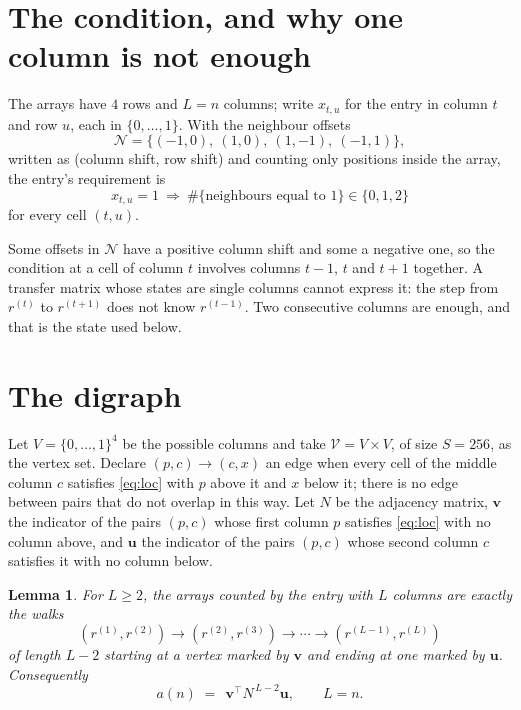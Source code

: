 \documentclass[11pt,a4paper]{article}
\theoremstyle{plain}
\newtheorem{lemma}[theorem]{Lemma}
\theoremstyle{definition}
\begin{document}
\section{The condition, and why one column is not enough}

The arrays have $4$ rows and $L=n$ columns; write $x_{t,u}$ for the entry in
column $t$ and row $u$, each in $\{0,\dots,1\}$. With the neighbour offsets
\[
\mathcal N=\{(-1,0),\ (1,0),\ (1,-1),\ (-1,1)\},
\]
written as (column shift, row shift) and counting only positions inside the array, the
entry's requirement is
\begin{equation}\label{eq:loc}
x_{t,u}=1\ \Rightarrow\ \#\{\text{neighbours equal to }1\}\in\{0,1,2\}
\end{equation}
for every cell $(t,u)$.

Some offsets in $\mathcal N$ have a positive column shift and some a negative one, so the
condition at a cell of column $t$ involves columns $t-1$, $t$ and $t+1$ together. A transfer
matrix whose states are single columns cannot express it: the step from $r^{(t)}$ to
$r^{(t+1)}$ does not know $r^{(t-1)}$. Two consecutive columns are enough, and that is
the state used below.

\section{The digraph}

Let $V=\{0,\dots,1\}^{4}$ be the possible columns and take
$\mathcal V=V\times V$, of size $S=256$, as the vertex set. Declare $(p,c)\to(c,x)$ an edge
when every cell of the middle column $c$ satisfies \eqref{eq:loc} with $p$ above it and $x$
below it; there is no edge between pairs that do not overlap in this way. Let $N$ be the
adjacency matrix, $\mathbf{v}$ the indicator of the pairs $(p,c)$ whose first column $p$
satisfies \eqref{eq:loc} with no column above, and $\mathbf{u}$ the indicator of
the pairs $(p,c)$ whose second column $c$ satisfies it with no column below.

\begin{lemma}\label{lem:walk}
For $L\ge2$, the arrays counted by the entry with $L$ columns are exactly the walks
\[
(r^{(1)},r^{(2)})\to(r^{(2)},r^{(3)})\to\cdots\to(r^{(L-1)},r^{(L)})
\]
of length $L-2$ starting at a vertex marked by $\mathbf{v}$ and ending at one marked by
$\mathbf{u}$. Consequently
\[
a(n)\;=\;\,\mathbf{v}^{\!\top}N^{\,L-2}\mathbf{u},\qquad L=n .
\]
\end{lemma}
\end{document}
